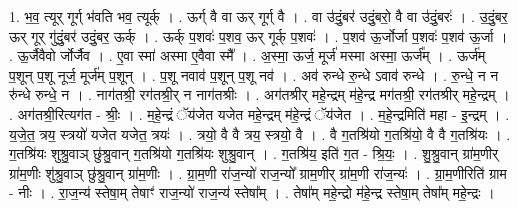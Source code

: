 \documentclass[17pt]{extarticle}
\begin{document}
1. भ॒व॒ त्यूर् गूर्ग् भ॑वति भव॒ त्यूर्क् । . ऊर्ग् वै वा ऊर् गूर्ग् वै । . वा उ॑दुं॒बर॑ उदुं॒बरो॒ वै वा उ॑दुं॒बरः॑ । . उ॒दुं॒बर॒ ऊर् गूर् गु॑दुं॒बर॑ उदुं॒बर॒ ऊर्क् । . ऊर्क् प॒शवः॑ प॒शव॒ ऊर् गूर्क् प॒शवः॑ । . प॒शव॑ ऊ॒र्जोर्जा प॒शवः॑ प॒शव॑ ऊ॒र्जा । . ऊ॒र्जैवैवो र्जोर्जैव । . ए॒वा स्मा॑ अस्मा ए॒वैवा स्मै᳚ । . अ॒स्मा॒ ऊर्ज॒ मूर्ज॑ मस्मा अस्मा॒ ऊर्ज᳚म् । . ऊर्ज॑म् प॒शून् प॒शू नूर्ज॒ मूर्ज॑म् प॒शून् । . प॒शू नवाव॑ प॒शून् प॒शू नव॑ । . अव॑ रुन्धे रु॒न्धे ऽवाव॑ रुन्धे । . रु॒न्धे॒ न न रु॑न्धे रुन्धे॒ न । . नाग॑तश्री॒ रग॑तश्री॒र् न नाग॑तश्रीः । . अग॑तश्रीर् महे॒न्द्रम् म॑हे॒न्द्र मग॑तश्री॒ रग॑तश्रीर् महे॒न्द्रम् । . अग॑तश्री॒रित्यग॑त - श्रीः॒ । . म॒हे॒न्द्रं ॅय॑जेत यजेत महे॒न्द्रम् म॑हे॒न्द्रं ॅय॑जेत । . म॒हे॒न्द्रमिति॑ महा - इ॒न्द्रम् । . य॒जे॒त॒ त्रय॒ स्त्रयो॑ यजेत यजेत॒ त्रयः॑ । . त्रयो॒ वै वै त्रय॒ स्त्रयो॒ वै । . वै ग॒तश्रि॑यो ग॒तश्रि॑यो॒ वै वै ग॒तश्रि॑यः । . ग॒तश्रि॑यः शुश्रु॒वाञ् छु॑श्रु॒वान् ग॒तश्रि॑यो ग॒तश्रि॑यः शुश्रु॒वान् । . ग॒तश्रि॑य॒ इति॑ ग॒त - श्रि॒यः॒ । . शु॒श्रु॒वान् ग्रा॑म॒णीर् ग्रा॑म॒णीः शु॑श्रु॒वाञ् छु॑श्रु॒वान् ग्रा॑म॒णीः । . ग्रा॒म॒णी रा॑ज॒न्यो॑ राज॒न्यो᳚ ग्राम॒णीर् ग्रा॑म॒णी रा॑ज॒न्यः॑ । . ग्रा॒म॒णीरिति॑ ग्राम - नीः । . रा॒ज॒न्य॑ स्तेषा॒म् तेषाꣳ॑ राज॒न्यो॑ राज॒न्य॑ स्तेषा᳚म् । . तेषा᳚म् महे॒न्द्रो म॑हे॒न्द्र स्तेषा॒म् तेषा᳚म् महे॒न्द्रः । \newline
\end{document}
